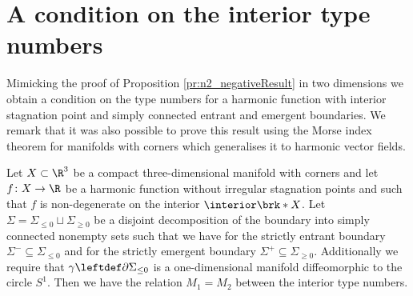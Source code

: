 \section{A condition on the interior type numbers}

Mimicking the proof of Proposition \ref{pr:n2_negativeResult} in two dimensions we obtain a condition on the type numbers for a harmonic function with interior
stagnation point and simply connected entrant and emergent boundaries.
We remark that it was also possible to prove this result using the Morse index theorem for manifolds with corners which generalises it to harmonic vector fields.
\begin{proposition}\label{pr:n3_inflowOutflowRels}
  Let $X\subset\R^3$ be a compact three-dimensional manifold with corners and
  let $f\colon X\to\R$ be a harmonic function without irregular stagnation points and such that $f$ is non-degenerate on the interior $\interior\brk*{X}$.
  Let $\Sigma=\Sigma_{\leq0}\sqcup\Sigma_{\geq0}$ be a disjoint decomposition of the boundary into simply connected nonempty sets such that
  we have for the strictly entrant boundary $\Sigma^-\subseteq\Sigma_{\leq0}$ and for the strictly emergent boundary
  $\Sigma^+\subseteq\Sigma_{\geq0}$. Additionally we require that $\gamma\leftdef\partial\Sigma_{\leq0}$ is a one-dimensional manifold diffeomorphic to the
  circle $S^1$.
  Then we have the relation $M_1=M_2$ between the interior type numbers.
\end{proposition}
